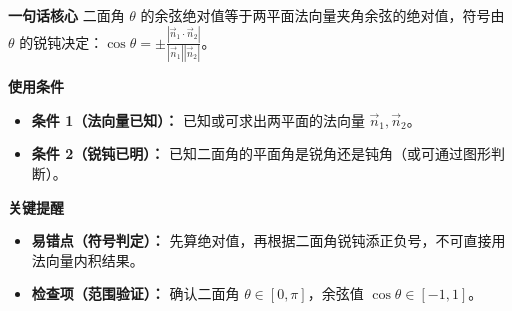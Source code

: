 \begin{summarybox}
	\textbf{\textcolor{CSummary}{一句话核心}}
	二面角 $\theta$ 的余弦绝对值等于两平面法向量夹角余弦的绝对值，符号由 $\theta$ 的锐钝决定：$\cos\theta = \pm\frac{|\vec{n}_1\cdot\vec{n}_2|}{|\vec{n}_1||\vec{n}_2|}$。

	\medskip
	\textbf{\textcolor{CSummary}{使用条件}}
	\begin{itemize}[leftmargin=*, itemsep=0.5em, topsep=0.4em]
		\item \textbf{条件 1（法向量已知）：} 已知或可求出两平面的法向量 $\vec{n}_1,\vec{n}_2$。
		\item \textbf{条件 2（锐钝已明）：} 已知二面角的平面角是锐角还是钝角（或可通过图形判断）。
	\end{itemize}

	\medskip
	\textbf{\textcolor{CSummary}{关键提醒}}
	\begin{itemize}[leftmargin=*, itemsep=0.5em, topsep=0.4em]
		\item \textbf{易错点（符号判定）：} 先算绝对值，再根据二面角锐钝添正负号，不可直接用法向量内积结果。
		\item \textbf{检查项（范围验证）：} 确认二面角 $\theta\in[0,\pi]$，余弦值 $\cos\theta\in[-1,1]$。
	\end{itemize}

\end{summarybox}

